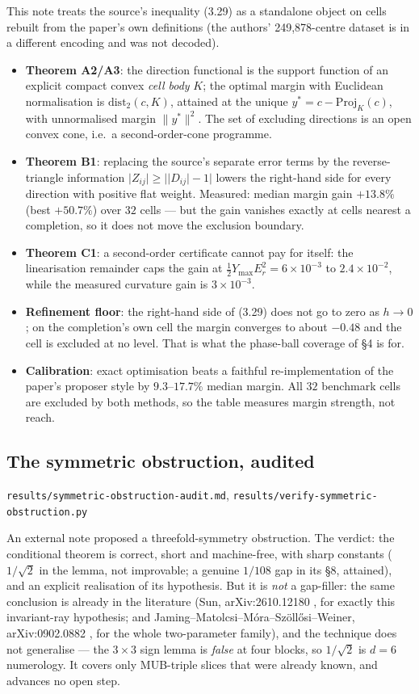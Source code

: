 \documentclass[10pt]{article}
\theoremstyle{definition}
\newcommand{\abs}[1]{\lvert #1\rvert}
\newcommand{\norm}[1]{\lVert #1\rVert}
\newcommand{\file}[1]{\texttt{\small #1}}
\begin{document}
This note treats the source's inequality (3.29) as a standalone object on cells rebuilt from the
paper's own definitions (the authors' 249,878-centre dataset is in a different encoding and was not
decoded).
\begin{itemize}[leftmargin=1.2em,itemsep=1pt]
\item \textbf{Theorem A2/A3}: the direction functional is the support function of an explicit compact
convex \emph{cell body} $K$; the optimal margin with Euclidean normalisation is $\mathrm{dist}_2(c,K)$,
attained at the unique $y^*=c-\mathrm{Proj}_K(c)$, with unnormalised margin $\norm{y^*}^2$. The set of
excluding directions is an open convex cone, i.e.\ a second-order-cone programme.
\item \textbf{Theorem B1}: replacing the source's separate error terms by the reverse-triangle
information $\abs{Z_{ij}}\ge\abs{\abs{D_{ij}}-1}$ lowers the right-hand side for every direction with
positive flat weight. Measured: median margin gain $+13.8\%$ (best $+50.7\%$) over $32$ cells --- but
the gain vanishes exactly at cells nearest a completion, so it does not move the exclusion boundary.
\item \textbf{Theorem C1}: a second-order certificate cannot pay for itself: the linearisation
remainder caps the gain at $\tfrac12Y_{\max}E_r^2=6\times10^{-3}$ to $2.4\times10^{-2}$, while the
measured curvature gain is $3\times10^{-3}$.
\item \textbf{Refinement floor}: the right-hand side of (3.29) does not go to zero as $h\to0$; on the
completion's own cell the margin converges to about $-0.48$ and the cell is excluded at no level. That
is what the phase-ball coverage of \S4 is for.
\item \textbf{Calibration}: exact optimisation beats a faithful re-implementation of the paper's
proposer style by $9.3$--$17.7\%$ median margin. All $32$ benchmark cells are excluded by both
methods, so the table measures margin strength, not reach.
\end{itemize}

\subsection{The symmetric obstruction, audited}\label{sec:sym}
\file{results/\allowbreak{}symmetric-\allowbreak{}obstruction-\allowbreak{}audit.md}, \file{results/\allowbreak{}verify-\allowbreak{}symmetric-\allowbreak{}obstruction.py}

An external note proposed a threefold-symmetry obstruction. The verdict: the conditional theorem is
correct, short and machine-free, with sharp constants ($1/\sqrt2$ in the lemma, not improvable; a
genuine $1/108$ gap in its \S8, attained), and an explicit realisation of its hypothesis. But it is
\emph{not} a gap-filler: the same conclusion is already in the literature (Sun, arXiv:2610.12180 \cite{sun26}, for
exactly this invariant-ray hypothesis; and Jaming--Matolcsi--M\'ora--Sz\"oll\H{o}si--Weiner,
arXiv:0902.0882 \cite{jmmsw09}, for the whole two-parameter family), and the technique does not generalise --- the
$3\times3$ sign lemma is \emph{false} at four blocks, so $1/\sqrt2$ is $d=6$ numerology. It covers only
MUB-triple slices that were already known, and advances no open step.
\end{document}

